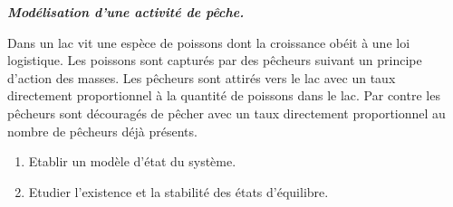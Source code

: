 \begin{exercice}{\bf \em Modélisation d'une activité de pêche.}

Dans un lac vit une espèce de poissons dont la croissance obéit à une loi logistique. Les poissons sont capturés par des pêcheurs suivant un principe d'action des masses. Les pêcheurs sont attirés vers le lac avec un taux directement proportionnel à la quantité de poissons dans le lac. Par contre les  pêcheurs sont découragés de pêcher avec un taux directement proportionnel au nombre de pêcheurs déjà présents.
\begin{enumerate}
\item Etablir un modèle d'état du système.
\item Etudier l'existence et la stabilité des états d'équilibre.
\end{enumerate}
\end{exercice}



